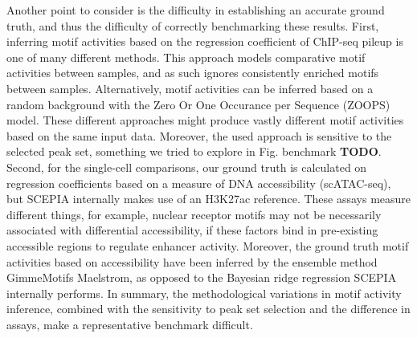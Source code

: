 Another point to consider is the difficulty in establishing an accurate ground truth, and thus the difficulty of correctly benchmarking these results. First, inferring motif activities based on the regression coefficient of ChIP-seq pileup is one of many different methods\cite{FANTOM2009,Balwierz2014,Madsen_2017}. This approach models comparative motif activities between samples, and as such ignores consistently enriched motifs between samples. Alternatively, motif activities can be inferred based on a random background with the Zero Or One Occurance per Sequence (ZOOPS) model\cite{Heinz2010, Bailey2021}. These different approaches might produce vastly different motif activities based on the same input data. Moreover, the used approach is sensitive to the selected peak set, something we tried to explore in Fig. benchmark \textbf{TODO}. Second, for the single-cell comparisons, our ground truth is calculated on regression coefficients based on a measure of DNA accessibility (scATAC-seq), but SCEPIA internally makes use of an H3K27ac reference. These assays measure different things, for example, nuclear receptor motifs may not be necessarily associated with differential accessibility, if these factors bind in pre-existing accessible regions to regulate enhancer activity. Moreover, the ground truth motif activities based on accessibility have been inferred by the ensemble method GimmeMotifs Maelstrom, as opposed to the Bayesian ridge regression SCEPIA internally performs. In summary, the methodological variations in motif activity inference, combined with the sensitivity to peak set selection and the difference in assays, make a representative benchmark difficult.

